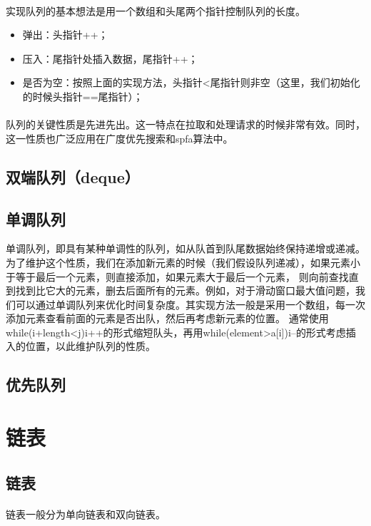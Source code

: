 \documentclass[12pt,a4paper,UTF16]{ctexbook}
\theoremstyle{plain}
\begin{document}
\paragraph{}实现队列的基本想法是用一个数组和头尾两个指针控制队列的长度。
\begin{itemize}
\item 弹出：头指针++；
\item 压入：尾指针处插入数据，尾指针++；
\item 是否为空：按照上面的实现方法，头指针<尾指针则非空（这里，我们初始化的时候头指针==尾指针）；
\end{itemize}
\paragraph{}队列的关键性质是先进先出。这一特点在拉取和处理请求的时候非常有效。同时，这一性质也广泛应用在广度优先搜索和spfa算法中。
\subsection{双端队列（deque）}
\subsection{单调队列}
单调队列，即具有某种单调性的队列，如从队首到队尾数据始终保持递增或递减。为了维护这个性质，我们在添加新元素的时候（我们假设队列递减），如果元素小于等于最后一个元素，则直接添加，如果元素大于最后一个元素，
则向前查找直到找到比它大的元素，删去后面所有的元素。例如，对于滑动窗口最大值问题，我们可以通过单调队列来优化时间复杂度。其实现方法一般是采用一个数组，每一次添加元素查看前面的元素是否出队，然后再考虑新元素的位置。
通常使用while(i+length<j){i++}的形式缩短队头，再用while(element>a[i]){i--}的形式考虑插入的位置，以此维护队列的性质。

\subsection{优先队列}
\section{链表}
\subsection{链表}
\paragraph{}链表一般分为单向链表和双向链表。
\end{document}
